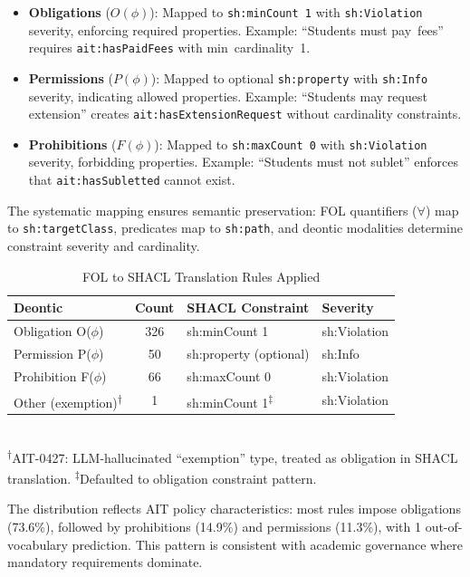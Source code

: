 \begin{itemize}
    \item \textbf{Obligations} ($O(\phi)$): Mapped to \texttt{sh:minCount~1} with \texttt{sh:Violation} severity, enforcing required properties. Example: ``Students must pay~fees'' requires \texttt{ait:hasPaidFees} with min~cardinality~1.
    
    \item \textbf{Permissions} ($P(\phi)$): Mapped to optional \texttt{sh:property} with \texttt{sh:Info} severity, indicating allowed properties. Example: ``Students may request extension'' creates \texttt{ait:hasExtensionRequest} without cardinality constraints.
    
    \item \textbf{Prohibitions} ($F(\phi)$): Mapped to \texttt{sh:maxCount~0} with \texttt{sh:Violation} severity, forbidding properties. Example: ``Students must not sublet'' enforces that \texttt{ait:hasSubletted} cannot exist.
\end{itemize}

The systematic mapping ensures semantic preservation: FOL quantifiers ($\forall$) map to \texttt{sh:targetClass}, predicates map to \texttt{sh:path}, and deontic modalities determine constraint severity and cardinality.

\begin{table}[htbp]
\centering
\caption{FOL to SHACL Translation Rules Applied}
\label{tab:translation-rules}
\begin{tabular}{|l|c|l|l|}
\hline
\textbf{Deontic} & \textbf{Count} & \textbf{SHACL Constraint} & \textbf{Severity} \\
\hline
Obligation O($\phi$) & 326 & sh:minCount 1 & sh:Violation \\
Permission P($\phi$) & 50 & sh:property (optional) & sh:Info \\
Prohibition F($\phi$) & 66 & sh:maxCount 0 & sh:Violation \\
Other (exemption)\textsuperscript{$\dagger$} & 1 & sh:minCount 1\textsuperscript{$\ddagger$} & sh:Violation \\
\hline
\end{tabular}
\\[4pt]
\footnotesize\textsuperscript{$\dagger$}AIT-0427: LLM-hallucinated ``exemption'' type, treated as obligation in SHACL translation. \textsuperscript{$\ddagger$}Defaulted to obligation constraint pattern.
\end{table}

The distribution reflects AIT policy characteristics: most rules impose obligations (73.6\%), followed by prohibitions (14.9\%) and permissions (11.3\%), with 1 out-of-vocabulary prediction. This pattern is consistent with academic governance where mandatory requirements dominate.

